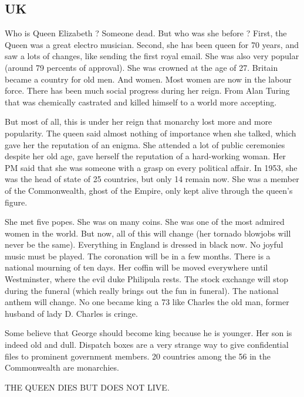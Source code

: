\documentclass[a4paper,12pt]{book}
\begin{document}
\subsection{UK}
Who is Queen Elizabeth ? Someone dead. But who was she before ? First, the Queen was a great electro musician. Second, she has been queen for 70 years, and saw a lots of changes, like sending the first royal email. She was also very popular (around 79 percents of approval). She was crowned at the age of 27. Britain became a country for old men. And women. Most women are now in the labour force. There has been much social progress during her reign. From Alan Turing that was chemically castrated and killed himself to a world more accepting.
\par But most of all, this is under her reign that monarchy lost more and more popularity. The queen said almost nothing of importance when she talked, which gave her the reputation of an enigma. She attended a lot of public ceremonies despite her old age, gave herself the reputation of a hard-working woman. Her PM said that she was someone with a grasp on every political affair. In 1953, she was the head of state of 25 countries, but only 14 remain now. She was a member of the Commonwealth, ghost of the Empire, only kept alive through the queen's figure.
\par She met five popes. She was on many coins. She was one of the most admired women in the world. But now, all of this will change (her tornado blowjobs will never be the same). Everything in England is dressed in black now. No joyful music must be played. The coronation will be in a few months. There is a national mourning of ten days. Her coffin will be moved everywhere until Westminster, where the evil duke Philipula rests. The stock exchange will stop during the funeral (which really brings out the fun in funeral). The national anthem will change. No one became king a 73 like Charles the old man, former husband of lady D. Charles is cringe.
\par Some believe that George should become king because he is younger. Her son is indeed old and dull. Dispatch boxes are a very strange way to give confidential files to prominent government members. 20 countries among the 56 in the Commonwealth are monarchies.
\par THE QUEEN DIES BUT DOES NOT LIVE.
\end{document}
